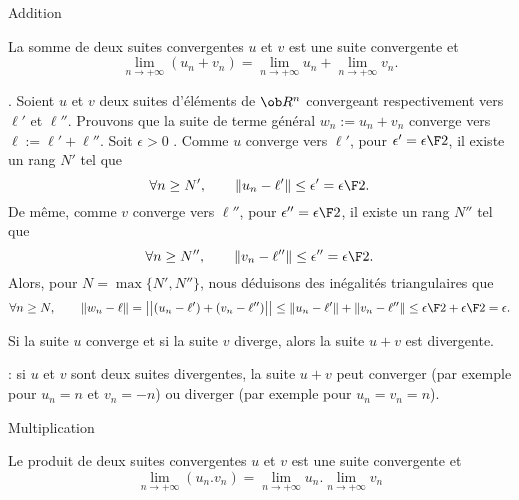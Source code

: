 \Concept [Index=Suites!limites!addition] Addition

La somme de deux suites convergentes $u$ et $v$ est une suite convergente et 
$$
\lim_{n\to+\infty}(u_n+v_n)=\lim_{n\to+\infty}u_n+\lim_{n\to+\infty}v_n.
$$

\Demonstration. Soient $u$ et $v$ deux suites d'éléments de $\ob R^n$ convergeant respectivement vers $\ell'$ et $\ell''$. 
Prouvons que la suite de terme général $w_n:=u_n+v_n$ converge vers $\ell:=\ell'+\ell''$. \pn 
 Soit $\epsilon>0$ . Comme $u$ converge vers $\ell'$, pour $\epsilon'={\epsilon\F2}$,  il existe un rang $N'$  tel que 
$$
\forall n\ge N', \qquad \|u_n-\ell'\|\le \epsilon'={\epsilon\F2}. 
$$
De même, comme $v$ converge vers $\ell''$, pour $\epsilon''={\epsilon\F2}$,  il existe un rang $N''$  tel que 
$$
\forall n\ge N'', \qquad \|v_n-\ell''\|\le \epsilon''={\epsilon\F2}. 
$$
Alors,  pour $N=\max\{N',N''\}$, nous déduisons des inégalités triangulaires que 
$$
\forall n\ge N , \qquad \|w_n-\ell\| =\big|\big|(u_n-\ell')+(v_n-\ell'')\big|\big|\le \|u_n-\ell'\|+\|v_n-\ell''\|\le
{\epsilon\F 2}+{\epsilon\F2}=\epsilon. 
$$ \CQFD


Si la suite $u$ converge et si la suite $v$ diverge, alors la suite $u+v$ est divergente. 


\Remarque : si $u$ et $v$ sont deux suites divergentes, la suite $u+v$ peut converger (par exemple pour $u_n=n$ et $v_n=-n$) ou diverger (par exemple pour $u_n=v_n=n$). 
\bigskip


\Concept [Index=Suites!limites!multiplication] Multiplication

Le produit de deux suites convergentes $u$ et $v$ est une suite convergente et 
$$
\lim_{n\to+\infty}(u_n.v_n)=\lim_{n\to+\infty}u_n.\lim_{n\to+\infty}v_n
$$

